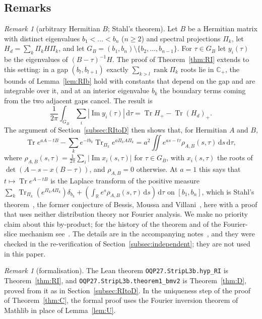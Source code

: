 \documentclass[11pt]{amsart}
\theoremstyle{definition}
\theoremstyle{remark}
\newtheorem{remark}[theorem]{Remark}
\numberwithin{equation}{section}
\newcommand{\R}{\mathbb{R}}
\newcommand{\C}{\mathbb{C}}
\newcommand{\Tr}{\operatorname{Tr}}
\renewcommand{\Im}{\operatorname{Im}}
\newcommand{\dd}{\,\mathrm{d}}
\begin{document}
\subsection{Remarks}

\begin{remark}[arbitrary Hermitian $B$; Stahl's theorem]\label{rem:RIgeneralB}
Let $B$ be a Hermitian matrix with distinct eigenvalues $b_1<\dots<b_n$ ($n\ge2$) and spectral projections $\Pi_k$, let
$H_d=\sum_k\Pi_kH\Pi_k$, and let $G_B=(b_1,b_n)\setminus\{b_2,\dots,b_{n-1}\}$. For $\tau\in G_B$ let $y_i(\tau)$ be the
eigenvalues of $(B-\tau)^{-1}H$. The proof of Theorem~\ref{thm:RI} extends to this setting: in a gap $(b_l,b_{l+1})$
exactly $\sum_{k>l}\operatorname{rank}\Pi_k$ roots lie in $\C_+$, the bounds of Lemma~\ref{lem:RIb} hold with constants that
depend on the gap and are integrable over it, and at an interior eigenvalue $b_k$ the boundary terms coming from the two
adjacent gaps cancel. The result is
\[
\frac1{2\pi}\int_{G_B}\sum_i|\Im y_i(\tau)|\dd\tau=\Tr H_+-\Tr(H_d)_+ .
\]
The argument of Section~\ref{subsec:RItoD} then shows that, for Hermitian $A$ and $B$,
\[
\Tr e^{aA-tB}-\sum_ke^{-tb_k}\Tr_{\Pi_k}e^{a\Pi_kA\Pi_k}=a^2\iint e^{as-t\tau}\rho_{A,B}(s,\tau)\dd s\dd\tau,
\]
where $\rho_{A,B}(s,\tau)=\frac1{2\pi}\sum_i|\Im x_i(s,\tau)|$ for $\tau\in G_B$, with $x_i(s,\tau)$ the roots of
$\det(A-s-x(B-\tau))$, and $\rho_{A,B}=0$ otherwise. At $a=1$ this says that $t\mapsto\Tr e^{A-tB}$ is the Laplace transform of
the positive measure $\sum_k\Tr_{\Pi_k}(e^{\Pi_kA\Pi_k})\delta_{b_k}+(\int_\R e^s\rho_{A,B}(s,\tau)\dd s)\dd\tau$ on $[b_1,b_n]$,
which is Stahl's theorem~\cite{Stahl}, the former conjecture of Bessis, Moussa and Villani~\cite{BMV}, here with a proof that
uses neither distribution theory nor Fourier analysis. We make no priority claim about this by-product; for the history of
the theorem and of the Fourier-slice mechanism see~\cite{Stahl,Eremenko,LS,He}. The details are in the accompanying
notes~\cite{repo-oqp27}, and they were checked in the re-verification of Section~\ref{subsec:independent}; they are
not used in this paper.
\end{remark}

\begin{remark}[formalisation]\label{rem:RIlean}
The Lean theorem \nolinkurl{OQP27.StripL3b.hyp_RI} is Theorem~\ref{thm:RI}, and \nolinkurl{OQP27.StripL3b.theorem1_bmv2}
is Theorem~\ref{thm:D}, proved from it as in Section~\ref{subsec:RItoD}. In the uniqueness step of the proof of
Theorem~\ref{thm:C}, the formal proof uses the Fourier inversion theorem of Mathlib in place of Lemma~\ref{lem:U}.
\end{remark}
\end{document}
